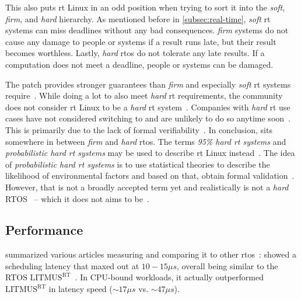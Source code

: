 \documentclass[10pt,twocolumn,a4paper]{article}
\begin{document}
This also puts \acrshort{rt} Linux in an odd position when trying to sort it into the \emph{soft}, \emph{firm}, and \emph{hard} hierarchy.
As mentioned before in \autoref{subsec:real-time}, \emph{soft} \acrshort{rt} systems can miss deadlines without any bad consequences.
\emph{firm} systems do not cause any damage to people or systems if a result runs late, but their result becomes worthless.
Lastly, \emph{hard} \acrshort{rtos} do not tolerate any late results.
If a computation does not meet a deadline, people or systems can be damaged.

The  patch provides stronger guarantees than \emph{firm} and especially \emph{soft} \acrshort{rt} systems require~\cite{reghenzani_realtime_2019}.
While doing a lot to also meet \emph{hard} \acrshort{rt} requirements, the community does not consider \acrshort{rt} Linux to be a \emph{hard} \acrshort{rt} system~\cite{barbieri_rt-linux_rtos}.
Companies with \emph{hard} \acrshort{rt} use cases have not considered switching to  and are unlikely to do so anytime soon~\cite{reghenzani_realtime_2019}.
This is primarily due to the lack of formal verifiability~\cite{reghenzani_realtime_2019}.
In conclusion,  sits somewhere in between \emph{firm} and \emph{hard} \acrshort{rtos}.
The terms \emph{95\% hard \acrshort{rt} systems} and \emph{probabilistic hard \acrshort{rt} systems} may be used to describe \acrshort{rt} Linux instead~\cite{reghenzani_realtime_2019}.
The idea of \emph{probabilistic hard \acrshort{rt} systems} is to use statistical theories to describe the likelihood of environmental factors and based on that, obtain formal validation~\cite{reghenzani_realtime_2019}.
However, that is not a broadly accepted term yet and realistically  is not a \emph{hard} RTOS~\cite{reghenzani_realtime_2019} -- which it does not aims to be~\cite{perlow_trenches_2021}.

\subsection{Performance}
\citeauthor{reghenzani_realtime_2019} summarized various articles measuring  and comparing it to other \acrshort{rtos}~\cite{reghenzani_realtime_2019}:
 showed a scheduling latency that maxed out at $10 - 15\mu s$, overall being similar to the RTOS $\text{LITMUS}^{\text{RT}}$~\cite{litmusrt}.
In CPU-bound workloads, it actually outperformed $\text{LITMUS}^{\text{RT}}$ in latency speed ($\sim 17\mu s$ vs. $\sim 47\mu s$).
\end{document}
